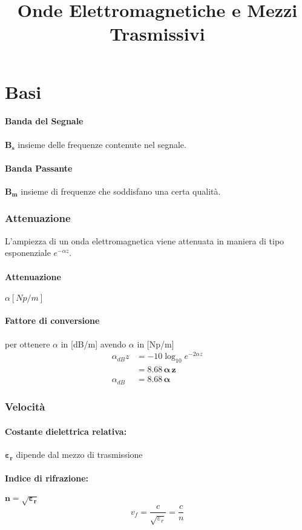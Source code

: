 \documentclass[16pt]{article}
\title{Onde Elettromagnetiche e Mezzi Trasmissivi}
\begin{document}
\maketitle

\section{Basi}

\paragraph{Banda del Segnale} $\mathbf{B_s}$ insieme delle frequenze contenute nel segnale.
\paragraph{Banda Passante} $\mathbf{B_m}$ insieme di frequenze che soddisfano una certa qualità.

\subsubsection{Attenuazione}
L'ampiezza di un onda elettromagnetica viene attenuata in maniera di tipo esponenziale $e^{-\alpha z}$.
\paragraph{Attenuazione} $\alpha [Np/m]$
\paragraph{Fattore di conversione} per ottenere $\alpha$ in [dB/m] avendo $\alpha$ in [Np/m]
\begin{align*}
	\alpha_{dB}z &= -10\log_{10}e^{-2\alpha z} \\
		     & = \mathbf{8.68\, \alpha\,z} \\
	\alpha_{dB} &=\mathbf{8.68\, \alpha}
\end{align*}
\subsubsection{Velocità}
\paragraph{Costante dielettrica relativa:}  $\mathbf{\varepsilon_r}$ dipende dal mezzo di trasmissione
\paragraph{Indice di rifrazione:} $\mathbf{n=\sqrt{\varepsilon_r}}$
\begin{equation}
	v_f = \frac{c}{\sqrt{\varepsilon_r}} = \frac{c}{n}
\end{equation}
\end{document}
